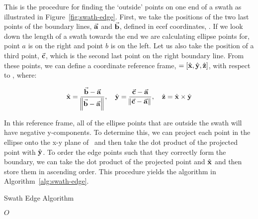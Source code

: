 This is the procedure for finding the `outside' points on one end of a swath as
illustrated in Figure~\ref{fig:swath-edge}. First, we take the positions of the
two last points of the boundary lines, $\vec{\bm{\mathrm{a}}}$ and $\vec{\bm{\mathrm{b}}}$, defined in
\gls{ecef} coordinates, \Fe. If we look down the length of a swath towards the
end we are calculating ellipse points for, point $a$ is on the right and point
$b$ is on the left.  Let us also take the position of a third point, $\vec{\bm{\mathrm{c}}}$,
which is the second last point on the right boundary line.  From these points,
we can define a coordinate reference frame, \Fs $= [\hat{\bm{\mathrm{x}}}, \hat{\bm{\mathrm{y}}},
\hat{\bm{\mathrm{z}}}]$, with respect to \Fe, where:

\begin{equation}
    \hat{\bm{\mathrm{x}}} = \frac{\vec{\bm{\mathrm{b}}}-\vec{\bm{\mathrm{a}}}}{\norm{\vec{\bm{\mathrm{b}}} - \vec{\bm{\mathrm{a}}}}}
    , \quad
    \hat{\bm{\mathrm{y}}} = \frac{\vec{\bm{\mathrm{c}}}-\vec{\bm{\mathrm{a}}}}{\norm{\vec{\bm{\mathrm{c}}} - \vec{\bm{\mathrm{a}}}}}
    , \quad
    \hat{\bm{\mathrm{z}}} = \hat{\bm{\mathrm{x}}} \times \hat{\bm{\mathrm{y}}}
\end{equation}

In this reference frame, all of the ellipse points that are outside the swath
will have negative y-components. To determine this, we can project each point
in the ellipse onto the x-y plane of \Fs~and then take the dot product of the
projected point with $\hat{\bm{\mathrm{y}}}$. To order the edge points such that they
correctly form the boundary, we can take the dot product of the projected point
and $\hat{\bm{\mathrm{x}}}$ and then store them in ascending order. This procedure yields
the algorithm in Algorithm~\ref{alg:swath-edge}.


\begin{algorithm}
    \caption{Swath Edge Algorithm} 
    \label{alg:swath-edge}
    \begin{algorithmic}[1] 
		
		
		


	    \EndIf
	\EndFor
	\State \Return $O$
	\EndFunction
    \end{algorithmic} 
\end{algorithm}

